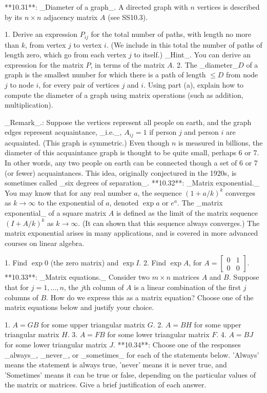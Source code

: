 

**10.31**: _Diameter of a graph_. A directed graph with \(n\) vertices is described by its \(n\times n\) adjacency matrix \(A\) (see SS10.3).

1. Derive an expression \(P_{ij}\) for the total number of paths, with length no more than \(k\), from vertex \(j\) to vertex \(i\). (We include in this total the number of paths of length zero, which go from each vertex \(j\) to itself.) _Hint_. You can derive an expression for the matrix \(P\), in terms of the matrix \(A\).
2. The _diameter_\(D\) of a graph is the smallest number for which there is a path of length \(\leq D\) from node \(j\) to node \(i\), for every pair of vertices \(j\) and \(i\). Using part (a), explain how to compute the diameter of a graph using matrix operations (such as addition, multiplication).

_Remark_.: Suppose the vertices represent all people on earth, and the graph edges represent acquaintance, _i.e._, \(A_{ij}=1\) if person \(j\) and person \(i\) are acquainted. (This graph is symmetric.) Even though \(n\) is measured in billions, the diameter of this acquaintance graph is thought to be quite small, perhaps 6 or 7. In other words, any two people on earth can be connected though a set of 6 or 7 (or fewer) acquaintances. This idea, originally conjectured in the 1920s, is sometimes called _six degrees of separation_.
**10.32**: _Matrix exponential._ You may know that for any real number \(a\), the sequence \((1+a/k)^{k}\) converges as \(k\to\infty\) to the exponential of \(a\), denoted \(\exp a\) or \(e^{a}\). The _matrix exponential_ of a square matrix \(A\) is defined as the limit of the matrix sequence \((I+A/k)^{k}\) as \(k\to\infty\). (It can shown that this sequence always converges.) The matrix exponential arises in many applications, and is covered in more advanced courses on linear algebra.

1. Find \(\exp 0\) (the zero matrix) and \(\exp I\).
2. Find \(\exp A\), for \(A=\left[\begin{array}{cc}0&1\\ 0&0\end{array}\right]\).
**10.33**: _Matrix equations._ Consider two \(m\times n\) matrices \(A\) and \(B\). Suppose that for \(j=1,\ldots,n\), the \(j\)th column of \(A\) is a linear combination of the first \(j\) columns of \(B\). How do we express this as a matrix equation? Choose one of the matrix equations below and justify your choice.

1. \(A=GB\) for some upper triangular matrix \(G\).
2. \(A=BH\) for some upper triangular matrix \(H\).
3. \(A=FB\) for some lower triangular matrix \(F\).
4. \(A=BJ\) for some lower triangular matrix \(J\).
**10.34**: Choose one of the responses _always_, _never_, or _sometimes_ for each of the statements below. 'Always' means the statement is always true, 'never' means it is never true, and 'Sometimes' means it can be true or false, depending on the particular values of the matrix or matrices. Give a brief justification of each answer.

